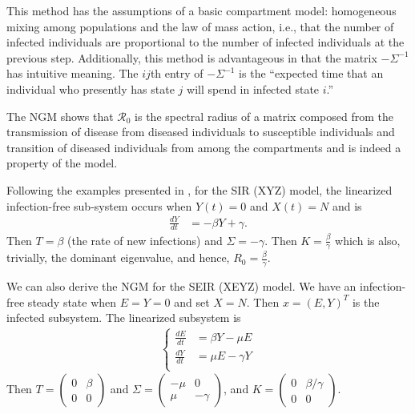 \documentclass[12pt]{article}
\newcommand{\rr}{\ensuremath{\mathcal{R}_0}}
\begin{document}
This method has the assumptions of a basic compartment model: homogeneous mixing among populations and the law of mass action, i.e., that the number of infected individuals are proportional to the number of infected individuals at the previous step.   Additionally, this method is advantageous in that the matrix $-\Sigma^{-1}$ has intuitive meaning.  The $ij$th entry of $- \Sigma^{-1}$ is the ``expected time that an individual who presently has state $j$ will spend in infected state $i$.''

The NGM shows that $\rr$ is the spectral radius of a matrix composed from the transmission of disease from diseased individuals to susceptible individuals and transition of diseased individuals from among the compartments and is indeed a property of the model.

Following the examples presented in \cite{diekmann1990}, for the SIR (XYZ) model, the linearized infection-free sub-system occurs when $Y(t)=0$ and $X(t)=N$ and is
\begin{align*}
\frac{dY}{dt} &= - \beta Y + \gamma .
  \end{align*}
  Then $T= \beta$ (the rate of new infections) and $\Sigma = -\gamma$.  Then $K = \frac{\beta}{\gamma}$ which is also, trivially, the dominant eigenvalue, and hence, $R_0 = \frac{\beta}{\gamma}$.

We can also derive the NGM for the SEIR (XEYZ) model.  We have an infection-free steady state when $E=Y=0$ and set $X=N$.  Then $x = (E, Y)^T$ is the infected subsystem.  The linearized subsystem is
  \begin{align*}
  \left \{
  \begin{array}{cl}
    \frac{dE}{dt} &= \beta Y  - \mu E\\
    \frac{dY}{dt} &=  \mu E  - \gamma Y \\
  \end{array}
  \right .
  \end{align*}
  Then $T = \left ( \begin{array}{cc} 0 & \beta \\ 0 & 0  \end{array} \right )$ and $\Sigma = \left ( \begin{array}{cc} -\mu & 0 \\ \mu & - \gamma \end{array} \right )$, and $K =\left ( \begin{array}{cc} 0& \beta / \gamma \\ 0 & 0 \end{array} \right  )$.
\end{document}
